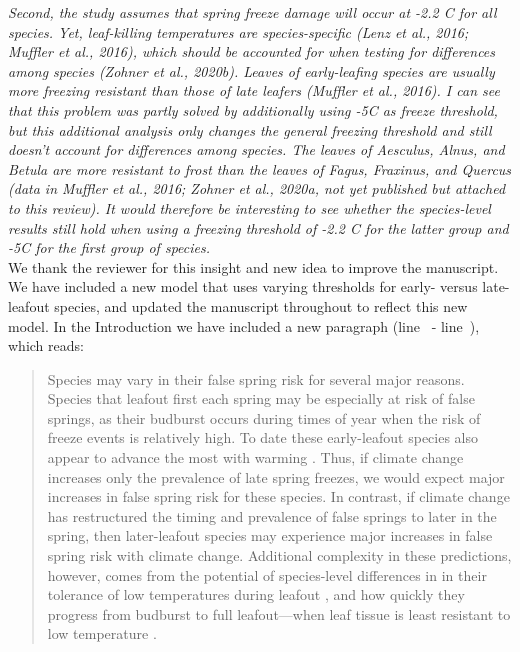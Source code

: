 \documentclass[11pt,a4paper]{article}\usepackage[]{graphicx}\usepackage[]{color}
\newcommand{\lr}[1]{line~\lineref{#1}}
\begin{document}
\newpage
\textit{Second, the study assumes that spring freeze damage will occur at -2.2 C for all species. Yet, leaf-killing temperatures are species-specific (Lenz et al., 2016; Muffler et al., 2016), which should be accounted for when testing for differences among species (Zohner et al., 2020b). Leaves of early-leafing species are usually more freezing resistant than those of late leafers (Muffler et al., 2016). I can see that this problem was partly solved by additionally using -5C as freeze threshold, but this additional analysis only changes the general freezing threshold and still doesn't account for differences among species. The leaves of Aesculus, Alnus, and Betula are more resistant to frost than the leaves of Fagus, Fraxinus, and Quercus (data in Muffler et al., 2016; Zohner et al., 2020a, not yet published but attached to this review). It would therefore be interesting to see whether the species-level results still hold when using a freezing threshold of -2.2 C for the latter group and -5C for the first group of species.} \\

We thank the reviewer for this insight and new idea to improve the manuscript. We have included a new model that uses varying thresholds for early- versus late-leafout species, and updated the manuscript throughout to reflect this new model. In the Introduction we have included a new paragraph (\lr{Z1thresh} - \lr{Z1threshend}), which reads:

\begin{quotation}
\noindent Species may vary in their false spring risk for several major reasons. Species that leafout first each spring may be especially at risk of false springs, as their budburst occurs during times of year when the risk of freeze events is relatively high. To date these early-leafout species also appear to advance the most with warming  \citep{Wolkovich2012}. Thus, if climate change increases only the prevalence of late spring freezes, we would expect major increases in false spring risk for these species. In contrast, if climate change has restructured the timing and prevalence of false springs to later in the spring, then later-leafout species may experience major increases in false spring risk with climate change. Additional complexity in these predictions, however, comes from the potential of species-level differences in in their tolerance of low temperatures during leafout \citep{Lenz2013}, and how quickly they progress from budburst to full leafout---when leaf tissue is least resistant to low temperature \citep{Augspurger2009,Lenz2013,Muffler2016,Zohner2020}.
\end{quotation}
\end{document}
